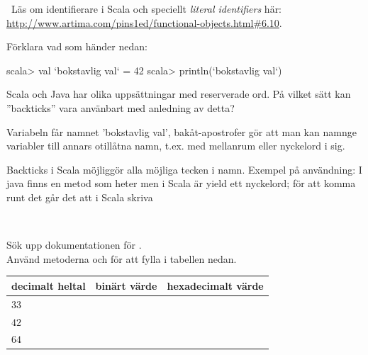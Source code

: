 \QUESTEND





\QUESTBEGIN

\Task\Uberkurs \what~Läs om identifierare i Scala och speciellt \emph{literal identifiers} här: \url{http://www.artima.com/pins1ed/functional-objects.html#6.10}.

\Subtask Förklara vad som händer nedan:
\begin{REPLnonum}
scala> val `bokstavlig val` = 42
scala> println(`bokstavlig val`)
\end{REPLnonum}

\Subtask Scala och Java har olika uppsättningar med reserverade ord. På vilket sätt kan ''backticks'' vara använbart med anledning av detta?

\SOLUTION

\TaskSolved \what

\SubtaskSolved Variabeln får namnet 'bokstavlig val', bakåt-apostrofer  gör att man kan namnge variabler till annars otillåtna namn, t.ex. med mellanrum eller nyckelord i sig.

\SubtaskSolved Backticks i Scala möjliggör alla möjliga tecken i namn. Exempel på användning: I java finns en metod som heter  men i Scala är yield ett nyckelord; för att komma runt det går det att i Scala skriva 

\QUESTEND













\QUESTBEGIN

\Task\Uberkurs \what~

\Subtask Sök upp dokumentationen för .\\Använd metoderna  och  för att fylla i tabellen nedan.

\begin{table}[H]
\begin{tabular}{l | l | l}
decimalt heltal & binärt värde & hexadecimalt värde \\
\hline
$33$ &   &  \\
$42$ &   &  \\
$64$ &   &  \\
\end{tabular}
\end{table}

